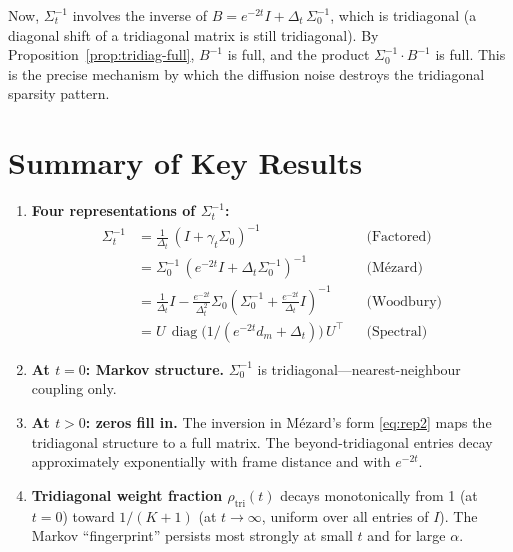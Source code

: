 \documentclass[11pt,a4paper]{article}
\newcommand{\diag}{\operatorname{diag}}
\newcommand{\Dt}{\Delta_t}
\begin{document}
Now, $\Sigma_t^{-1}$ involves the inverse of $B = e^{-2t}I + \Dt\,\Sigma_0^{-1}$, which is tridiagonal (a diagonal shift of a tridiagonal matrix is still tridiagonal).  By Proposition~\ref{prop:tridiag-full}, $B^{-1}$ is full, and the product $\Sigma_0^{-1} \cdot B^{-1}$ is full.  This is the precise mechanism by which the diffusion noise destroys the tridiagonal sparsity pattern.


\section{Summary of Key Results}
\label{sec:summary}

\begin{keyresult}
\begin{enumerate}[label=\textbf{\arabic*.}, leftmargin=2em]
  \item \textbf{Four representations of $\Sigma_t^{-1}$:}
  \begin{align}
    \Sigma_t^{-1} &= \tfrac{1}{\Dt}\,(I + \gamma_t\Sigma_0)^{-1} & & \text{(Factored)} \label{eq:rep1}\\
    &= \Sigma_0^{-1}\,(e^{-2t}I + \Dt\Sigma_0^{-1})^{-1} & & \text{(M\'ezard)} \label{eq:rep2}\\
    &= \tfrac{1}{\Dt}I - \tfrac{e^{-2t}}{\Dt^2}\Sigma_0(\Sigma_0^{-1} + \tfrac{e^{-2t}}{\Dt}I)^{-1} & & \text{(Woodbury)} \label{eq:rep3}\\
    &= U\,\diag\!\bigl(1/(e^{-2t}d_m + \Dt)\bigr)\,U^\top & & \text{(Spectral)} \label{eq:rep4}
  \end{align}

  \item \textbf{At $t = 0$: Markov structure.}  $\Sigma_0^{-1}$ is tridiagonal---nearest-neighbour coupling only.

  \item \textbf{At $t > 0$: zeros fill in.}  The inversion in M\'ezard's form \eqref{eq:rep2} maps the tridiagonal structure to a full matrix.  The beyond-tridiagonal entries decay approximately exponentially with frame distance and with $e^{-2t}$.

  \item \textbf{Tridiagonal weight fraction $\rho_{\mathrm{tri}}(t)$} decays monotonically from 1 (at $t = 0$) toward $1/(K+1)$ (at $t \to \infty$, uniform over all entries of $I$).  The Markov ``fingerprint'' persists most strongly at small $t$ and for large $\alpha$.


\end{enumerate}
\end{keyresult}
\end{document}
